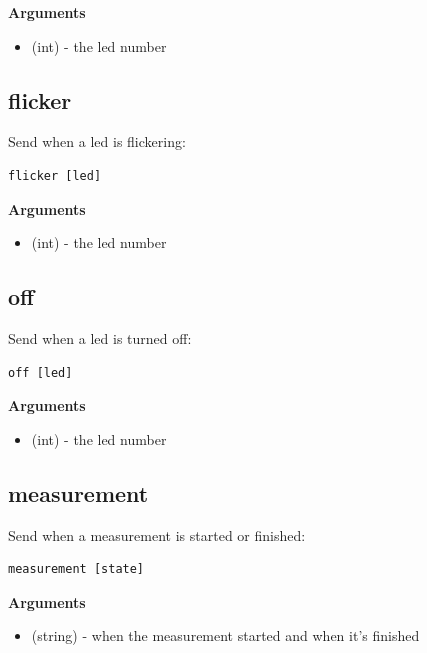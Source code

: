 \textbf{Arguments}
\begin{itemize}
\item {} 
 (int) - the led number

\end{itemize}


\subsection{flicker}
\label{appendix/led-protocol:id2}\label{appendix/led-protocol:protocol-output-flicker}
Send when a led is flickering:

\begin{verbatim}
flicker [led]
\end{verbatim}

\textbf{Arguments}
\begin{itemize}
\item {} 
 (int) - the led number

\end{itemize}


\subsection{off}
\label{appendix/led-protocol:protocol-output-off}\label{appendix/led-protocol:id3}
Send when a led is turned off:

\begin{verbatim}
off [led]
\end{verbatim}

\textbf{Arguments}
\begin{itemize}
\item {} 
 (int) - the led number

\end{itemize}


\subsection{measurement}
\label{appendix/led-protocol:id4}\label{appendix/led-protocol:protocol-output-measurement}
Send when a measurement is started or finished:

\begin{verbatim}
measurement [state]
\end{verbatim}

\textbf{Arguments}
\begin{itemize}
\item {} 
 (string) -  when the measurement started and  when it's finished

\end{itemize}


